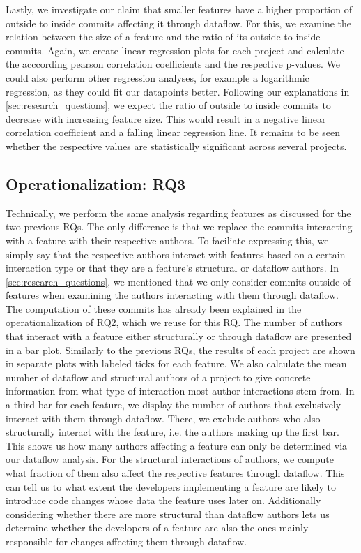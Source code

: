 Lastly, we investigate our claim that smaller features have a higher proportion of outside to inside commits affecting it through dataflow.
For this, we examine the relation between the size of a feature and the ratio of its outside to inside commits.
Again, we create linear regression plots for each project and calculate the acccording pearson correlation coefficients and the respective p-values.
We could also perform other regression analyses, for example a logarithmic regression, as they could fit our datapoints better.
Following our explanations in \autoref{sec:research_questions}, we expect the ratio of outside to inside commits to decrease with increasing feature size.
This would result in a negative linear correlation coefficient and a falling linear regression line.
It remains to be seen whether the respective values are statistically significant across several projects.

\subsection[RQ3]{Operationalization: RQ3}\label{sec:op:RQ3}

Technically, we perform the same analysis regarding features as discussed for the two previous RQs.
The only difference is that we replace the commits interacting with a feature with their respective authors.
To faciliate expressing this, we simply say that the respective authors interact with features based on a certain interaction type or that they are a feature's structural or dataflow authors.
In \autoref{sec:research_questions}, we mentioned that we only consider commits outside of features when examining the authors interacting with them through dataflow.
The computation of these commits has already been explained in the operationalization of RQ2, which we reuse for this RQ.
The number of authors that interact with a feature either structurally or through dataflow are presented in a bar plot.
Similarly to the previous RQs, the results of each project are shown in separate plots with labeled ticks for each feature.
We also calculate the mean number of dataflow and structural authors of a project to give concrete information from what type of interaction most author interactions stem from.
In a third bar for each feature, we display the number of authors that exclusively interact with them through dataflow.
There, we exclude authors who also structurally interact with the feature, i.e. the authors making up the first bar.
This shows us how many authors affecting a feature can only be determined via our dataflow analysis.
For the structural interactions of authors, we compute what fraction of them also affect the respective features through dataflow.
This can tell us to what extent the developers implementing a feature are likely to introduce code changes whose data the feature uses later on.
Additionally considering whether there are more structural than dataflow authors lets us determine whether the developers of a feature are also the ones mainly responsible for changes affecting them through dataflow.

